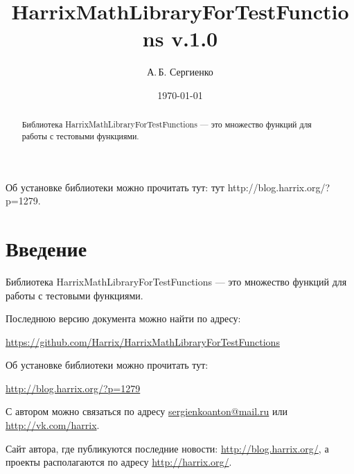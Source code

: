 \documentclass[a4paper,12pt]{article}
\title{HarrixMathLibraryForTestFunctions v.1.0}
\author{А.\,Б. Сергиенко}
\date{\today}
\begin{document}


\maketitle

\begin{abstract}
Библиотека HarrixMathLibraryForTestFunctions --- это множество функций для работы с тестовыми функциями.
\end{abstract}

\tableofcontents

\newpage

Об установке библиотеки можно прочитать тут: тут http://blog.harrix.org/?p=1279.

\section{Введение}

Библиотека HarrixMathLibraryForTestFunctions --- это множество функций для работы с тестовыми функциями.

Последнюю версию документа можно найти по адресу:

\href{https://github.com/Harrix/HarrixMathLibraryForTestFunctions}{https://github.com/Harrix/HarrixMathLibraryForTestFunctions}

Об установке библиотеки можно прочитать тут:

\href{http://blog.harrix.org/?p=1279}{http://blog.harrix.org/?p=1279}

С автором можно связаться по адресу \href{mailto:sergienkoanton@mail.ru}{sergienkoanton@mail.ru} или  \href{http://vk.com/harrix}{http://vk.com/harrix}.

Сайт автора, где публикуются последние новости: \href{http://blog.harrix.org/}{http://blog.harrix.org/}, а проекты располагаются по адресу \href{http://harrix.org/}{http://harrix.org/}.

\newpage
\end{document}
